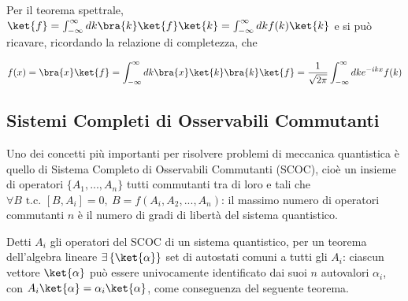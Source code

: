 Per il teorema spettrale, $ \ket{f} = \int_{-\infty}^{\infty}dk\bra{k}\ket{f}\ket{k}
= \int_{-\infty}^{\infty}dkf(k)\ket{k}$ e si
può ricavare, ricordando la relazione di completezza, che

$$ f(x)=\bra{x}\ket{f} = \int_{-\infty}^{\infty}dk\bra{x}\ket{k}\bra{k}\ket{f} = 
\frac{1}{\sqrt{2\pi}}\int_{-\infty}^{\infty}dk e^{-ikx}f(k)$$ 


\subsection{Sistemi Completi di Osservabili Commutanti}
Uno dei concetti più importanti per risolvere problemi di meccanica quantistica è
quello di Sistema Completo di Osservabili Commutanti (SCOC), cioè un insieme di operatori
$ \{ A_1,...,A_n \} $ tutti commutanti tra di loro e tali che
$\forall B\text{ t.c. } [B,A_i] = 0,\: B =f(A_i,A_2,...,A_n)$: il massimo
numero di operatori commutanti $ n $  è il numero di gradi di libertà del sistema quantistico.

Detti $ A_i $ gli operatori del SCOC di un sistema quantistico, per un teorema dell'algebra
lineare $ \exists \left\{ \ket{\alpha} \right\}$ set di autostati comuni a tutti gli $ A_i$:
ciascun vettore $ \ket{\alpha} $ può essere univocamente identificato dai suoi $ n $
autovalori $ \alpha_i $, con $ A_i\ket{\alpha} = \alpha_i\ket{\alpha} $, come conseguenza
del seguente teorema.

\noindent{}

